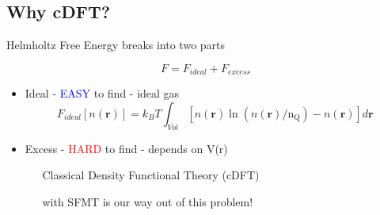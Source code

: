 \documentclass{beamer}
\renewcommand{\vec}[1]{\mathbf{#1}}
\begin{document}
\subsection{Why cDFT?}
\begin{frame}{Helmholtz Free Energy breaks into two parts}
    \begin{block}{}
        \vspace{-2em}
        \begin{displaymath}F=F_{ideal} + F_{excess}\end{displaymath}
        \vspace{-.7em}        
        \begin{itemize}            
           \item Ideal - \textcolor{blue}{EASY} to find - ideal gas 
           \begin{displaymath}F_{ideal}[n(\vec{r})]= k_BT\int_{Vol}[n(\vec{r})\ln(n(\vec{r})/\text{n}_\text{Q})-n(\vec{r})]d\vec{r}\end{displaymath}
           \vspace{+0.01em} 
           \item Excess - \textcolor{red}{HARD} to find - depends on V(r) 
           
        \vspace{+1.5em} 
            $~~~~~~~$Classical Density Functional Theory (cDFT)  
            
            $~~~~~~~$with SFMT is our way out of this problem!
        \end{itemize}
     \end{block}
\end{frame}
\end{document}
